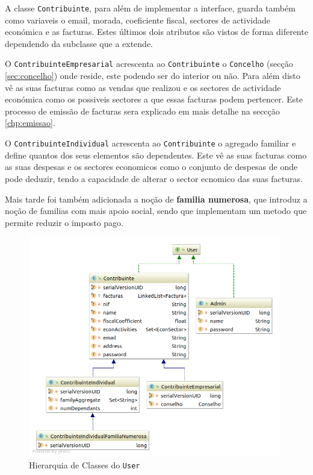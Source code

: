 \documentclass[12pt,a4paper]{report}
\begin{document}
    A classe \texttt{Contribuinte}, para além de implementar a interface,
    guarda também como variaveis o email, morada, coeficiente fiscal, sectores
    de actividade económica e as facturas. Estes últimos dois atributos são
    vistos de forma diferente dependendo da subclasse que a extende.

    O \texttt{ContribuinteEmpresarial} acrescenta ao
    \texttt{Contribuinte} o \texttt{Concelho} (secção
    \ref{sec:concelho}) onde reside, este podendo ser do interior ou não. Para além
    disto vê as suas facturas como as vendas que realizou e os sectores de
    actividade económica como os possiveis sectores a que essas facturas podem
    pertencer. Este processo de emissão de facturas sera explicado em mais detalhe
    na seccção \ref{chp:emissao}.

    O \texttt{ContribuinteIndividual} acrescenta ao
    \texttt{Contribuinte} o agregado familiar e define quantos dos seus
    elementos são dependentes. Este vê as suas facturas como as suas despesas e os
    sectores economicos como o conjunto de despesas de onde pode deduzir, tendo a
    capacidade de alterar o sector ecnomico das suas facturas.

    Mais tarde foi também adicionada a noção de \textbf{familia numerosa}, que
    introduz a noção de familias com mais apoio social, sendo que implementam um
    metodo que permite reduzir o imposto pago.

    \begin{figure}[H]
        \centering
        \includegraphics[width=11cm]{./images/UserHierarquy.png}
        \caption{Hierarquia de Classes do \texttt{User}}
        \label{fig:Hierarquia}
    \end{figure}
\end{document}
